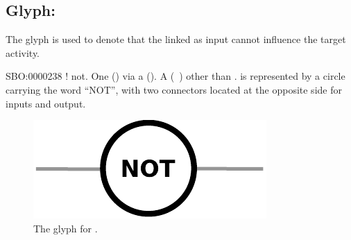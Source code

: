 \subsection{Glyph: }
\label{sec:af:not}

The glyph  is used to denote that the  linked as input cannot influence the target activity.

\begin{glyphDescription}
 \glyphSboTerm SBO:0000238 ! not.
 \glyphOrigin One  () via a  ().
 \glyphTarget A  (~) other than .
 \glyphNode {} is represented by a circle carrying the word ``NOT'', with two connectors located at the opposite side for inputs and output.
 \end{glyphDescription}

\begin{figure}[H]
  \centering
  \includegraphics[scale = 0.5]{images/build/not.pdf}
  \caption{The \AF glyph for .}
  \label{fig:af:not}
\end{figure}

